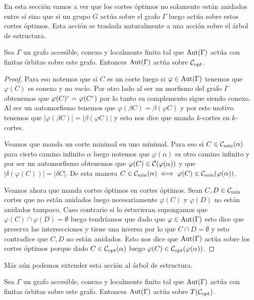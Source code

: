 \documentclass[tesis.tex]{subfiles}
\begin{document}
En esta sección vamos a ver que los cortes óptimos no solamente están anidados entre sí sino que si un grupo $G$ actúa sobre el grafo $\Gamma$ luego actúa sobre estos cortes óptimos.
Esta acción se traslada naturalmente a una acción sobre el árbol de estructura.



\begin{prop}
	Sea $\Gamma$ un grafo accesible, conexo y localmente finito tal que $\text{Aut}(\Gamma)$ actúa con finitas órbitas sobre este grafo.
	Entonces $\text{Aut}(\Gamma)$ actúa sobre ${\cal C}_{\text{opt}}$.
\end{prop}

\begin{proof}
	Para eso notemos que si $C$ es un corte luego si $\varphi \in \text{Aut}(\Gamma)$ tenemos que $\varphi(C)$ es conexo y no vacío. 
	Por otro lado al ser un morfismo del grafo $\Gamma$ obtenemos que $\varphi(C)^{c} = \varphi(C^{c})$ por lo tanto su complemento sigue siendo conexo.
	Al ser un automorfismo tenemos que $\varphi(\beta C) = \beta (\varphi C)$ y por este motivo tenemos que $|\varphi (\beta C)| = |\beta (\varphi C)|$ y esto nos dice que manda $k$-cortes en $k$-cortes.
	
	
	Veamos que manda un corte minimal en uno minimal. 
	Para eso si $C \in {{\cal C}}_{\text{min}}(\alpha)$ para cierto camino infinito $\alpha$ luego notemos que $\varphi(\alpha)$ es otro camino infinito y por ser un automorfismo obtenemos que $\varphi(C) \in {\cal C}({\varphi(\alpha)})$ y que $|\delta(\varphi(C))| = |\delta C|$.
	De esta manera $C \in {\cal C}_{\text{min}}(\alpha) \iff \varphi(C) \in {\cal C}_{\text{min}}(\varphi(\alpha))$.
	
	
	Veamos ahora que manda cortes óptimos en cortes óptimos.
	Sean $C,D \in {\cal C}_{\text{min}}$ cortes que no están anidados luego necesariamente $\varphi(C)$ y $\varphi(D)$ no están anidados tampoco.
	Caso contrario si lo estuvieran supongamos que $\varphi(C) \cap \varphi(D) = \emptyset$ luego tendríamos que dado que $\varphi \in \text{Aut}(\Gamma)$ esto dice que preserva las intersecciones y tiene una inversa por lo que $C \cap D = \emptyset$ y esto contradice que $C, D$ no están anidados.
	Esto nos dice que $\text{Aut}(\Gamma)$ actúa sobre los cortes óptimos porque dado $C \in {\cal C}_{\text{opt}}(\alpha)$ luego $\varphi(C) \in {\cal C}_{\text{opt}}(\varphi(\alpha))$.
	
\end{proof}

Más aún podemos extender esta acción al árbol de estructura.

\begin{coro}
	Sea $\Gamma$ un grafo accesible, conexo y localmente finito tal que $\text{Aut}(\Gamma)$ actúa con finitas órbitas sobre este grafo.
	Entonces $\text{Aut}(\Gamma)$ actúa sobre $T({\cal C}_{\text{opt}})$.
\end{coro}
\end{document}
